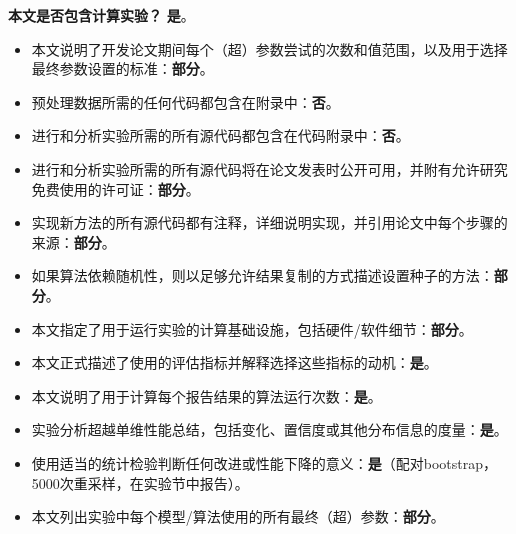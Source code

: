 \documentclass[letterpaper]{article}
\begin{document}
\noindent\textbf{本文是否包含计算实验？} \textbf{是}。
\begin{itemize}
\item 本文说明了开发论文期间每个（超）参数尝试的次数和值范围，以及用于选择最终参数设置的标准：\textbf{部分}。
\item 预处理数据所需的任何代码都包含在附录中：\textbf{否}。
\item 进行和分析实验所需的所有源代码都包含在代码附录中：\textbf{否}。
\item 进行和分析实验所需的所有源代码将在论文发表时公开可用，并附有允许研究免费使用的许可证：\textbf{部分}。
\item 实现新方法的所有源代码都有注释，详细说明实现，并引用论文中每个步骤的来源：\textbf{部分}。
\item 如果算法依赖随机性，则以足够允许结果复制的方式描述设置种子的方法：\textbf{部分}。
\item 本文指定了用于运行实验的计算基础设施，包括硬件/软件细节：\textbf{部分}。
\item 本文正式描述了使用的评估指标并解释选择这些指标的动机：\textbf{是}。
\item 本文说明了用于计算每个报告结果的算法运行次数：\textbf{是}。
\item 实验分析超越单维性能总结，包括变化、置信度或其他分布信息的度量：\textbf{是}。
\item 使用适当的统计检验判断任何改进或性能下降的意义：\textbf{是}（配对bootstrap，5000次重采样，在实验节中报告）。
\item 本文列出实验中每个模型/算法使用的所有最终（超）参数：\textbf{部分}。
\end{itemize}
\end{document}
